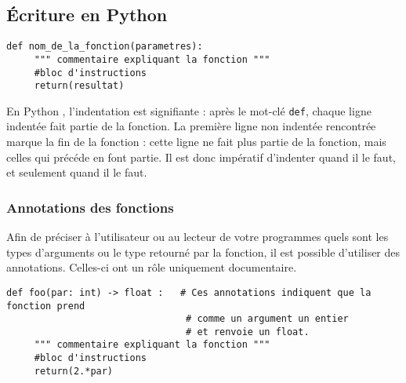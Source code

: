 \subsection{\'Ecriture en Python }

\begin{lstlisting}
def nom_de_la_fonction(parametres):
     """ commentaire expliquant la fonction """
     #bloc d'instructions
     return(resultat)
\end{lstlisting}

\begin{remarque}
En Python , l'indentation est {signifiante} : après le mot-clé \lstinline{def}, chaque 
ligne indentée fait partie de la fonction. La première ligne non indentée rencontrée marque la 
fin de la fonction : cette ligne ne fait plus partie de la fonction, mais celles qui précéde en 
font partie. Il est donc {impératif} d'indenter quand il le faut, et seulement 
quand il le faut.%
\end{remarque}

\subsubsection*{Annotations des fonctions}

Afin de préciser à l'utilisateur ou au lecteur de votre programmes quels sont les types d'arguments ou le type retourné par la fonction, il est possible d'utiliser des annotations. Celles-ci ont un rôle uniquement documentaire.
\begin{lstlisting}
def foo(par: int) -> float :   # Ces annotations indiquent que la fonction prend 
                                # comme un argument un entier 
                                # et renvoie un float.
     """ commentaire expliquant la fonction """
     #bloc d'instructions
     return(2.*par)
\end{lstlisting}


